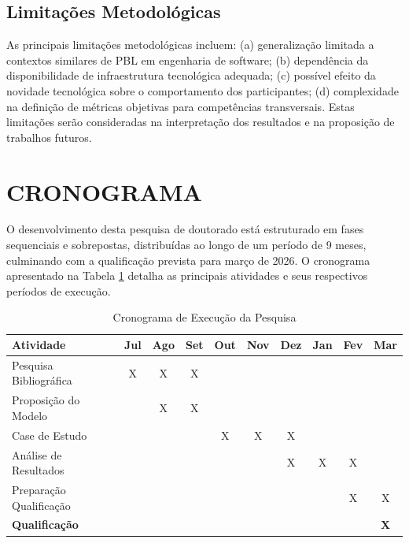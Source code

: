 \documentclass[12pt,a4paper]{article}
\begin{document}
\subsection{Limitações Metodológicas}

As principais limitações metodológicas incluem: (a) generalização limitada a
contextos similares de PBL em engenharia de software; (b) dependência da
disponibilidade de infraestrutura tecnológica adequada; (c) possível efeito da
novidade tecnológica sobre o comportamento dos participantes; (d) complexidade
na definição de métricas objetivas para competências transversais. Estas
limitações serão consideradas na interpretação dos resultados e na proposição
de trabalhos futuros.

\section{CRONOGRAMA}

O desenvolvimento desta pesquisa de doutorado está estruturado em fases
sequenciais e sobrepostas, distribuídas ao longo de um período de 9 meses,
culminando com a qualificação prevista para março de 2026. O cronograma
apresentado na Tabela \ref{tab:cronograma} detalha as principais atividades e
seus respectivos períodos de execução.

\begin{table}[htbp]
  \centering
  \caption{Cronograma de Execução da Pesquisa}
  \label{tab:cronograma}
  \begin{tabular}{|l|c|c|c|c|c|c|c|c|c|}
    \hline
    \textbf{Atividade}      & \textbf{Jul} & \textbf{Ago} & \textbf{Set} & \textbf{Out} & \textbf{Nov} & \textbf{Dez} & \textbf{Jan} & \textbf{Fev} & \textbf{Mar} \\
    \hline
    Pesquisa Bibliográfica  & X            & X            & X            &              &              &              &              &              &              \\
    \hline
    Proposição do Modelo    &              & X            & X            &              &              &              &              &              &              \\
    \hline
    Case de Estudo          &              &              &              & X            & X            & X            &              &              &              \\
    \hline
    Análise de Resultados   &              &              &              &              &              & X            & X            & X            &              \\
    \hline
    Preparação Qualificação &              &              &              &              &              &              &              & X            & X            \\
    \hline
    \textbf{Qualificação}   &              &              &              &              &              &              &              &              & \textbf{X}   \\
    \hline
  \end{tabular}
\end{table}
\end{document}
